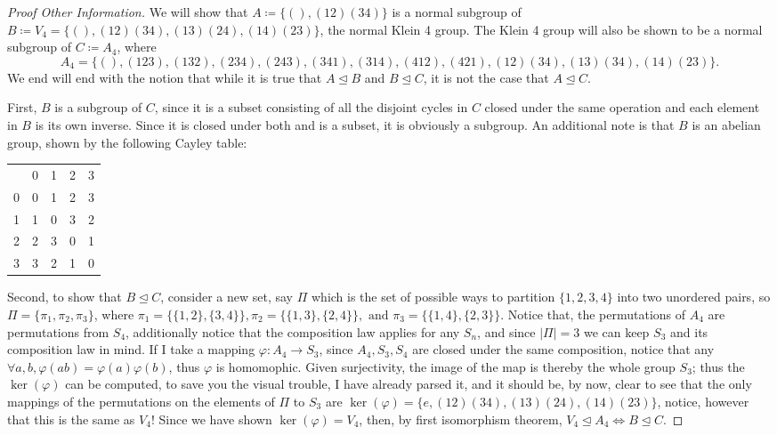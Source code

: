 \documentclass[11pt,letterpaper]{article}
\begin{document}
\begin{proof}[Proof Other Information]
We will show that \( A\coloneqq  \{ (), (12)(34)\} \) is a normal subgroup of \\ \( B\coloneqq V_4=\{ (),(12)(34),(13)(24),(14)(23)\} \), the normal Klein 4 group. The Klein 4 group will also be shown to be a normal subgroup of \(C\coloneqq  A_{4} \), where 
\[
  A_{4}=\{ (),(123),(132),(234),(243),(341),(314),(412),(421),(12)(34),(13)(34),(14)(23) \}
.\] 
We end will end with the notion that while it is true that \( A\unlhd B \) and \( B\unlhd C \), it is not the case that \( A\unlhd C \). 


  First, \( B \) is a subgroup of \( C \), since it is a subset consisting of all the disjoint cycles in \( C \) closed under the same operation and each element in \( B \) is its own inverse. Since it is closed under both and is a subset, it is obviously a subgroup. An additional note is that \( B \) is an abelian group, shown by the following Cayley table:


  \begin{center}
  \noindent\begin{tabular}[h!]{c | c c c c}
     & 0 & 1 & 2 & 3   \\
    \cline{1-5}
    0 & 0 & 1 & 2 & 3  \\
    1 & 1 & 0 & 3 & 2 \\
    2 & 2 & 3 & 0 & 1 \\
    3 & 3 & 2 & 1 & 0 \\
\end{tabular}
\end{center}



  Second, to show that \( B\unlhd C \), consider a new set, say \( \Pi \) which is the set of possible ways to partition \( \{ 1,2,3,4\} \) into two unordered pairs, so \( \Pi = \{ \pi_{1},\pi_{2}, \pi_{3}\} \), where \( \pi_{1}=\{ \{1,2 \}, \{3,4\} \}, \pi_{2}=\{ \{1,3 \},\{2,4\} \}, \text{ and } \pi_{3}=\{\{1,4\},\{2,3\}\}\). Notice that, the permutations of \( A_{4} \) are permutations from \( S_{4} \), additionally notice that the composition law applies for any \( S_n \), and since \( |\Pi | =3 \) we can keep \( S_3 \) and its composition law in mind. If I take a mapping \( \varphi : A_4 \to S_3 \), since \( A_4, S_{3}, S_4 \) are closed under the same composition, notice that any \( \forall a,b, \varphi (ab)=\varphi (a)\varphi (b) \), thus \( \varphi  \) is homomophic. Given surjectivity, the image of the map is thereby the whole group \( S_3 \); thus the \( \ker (\varphi)\) can be computed, to save you the visual trouble, I have already parsed it, and it should be, by now, clear to see that the only mappings of the permutations on the elements of \( \Pi \) to \( S_{3} \) are \( \ker(\varphi)=\{e,(12)(34),(13)(24),(14)(23) \} \), notice, however that this is the same as \( V_4 \)! Since we have shown \( \ker (\varphi )= V_4\), then, by first isomorphism theorem, \( V_4 \unlhd A_4 \iff B  \unlhd C\). 


\end{proof}
\end{document}
